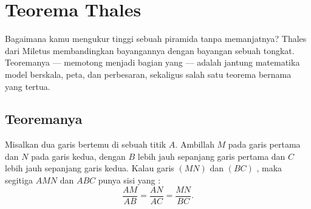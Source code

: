 \chapter{Teorema Thales}\label{ch:g9:thales}

Bagaimana kamu mengukur tinggi sebuah piramida tanpa memanjatnya?
Thales dari Miletus membandingkan bayangannya dengan bayangan sebuah
tongkat. Teoremanya ---  memotong  menjadi
bagian yang  --- adalah jantung matematika model berskala,
peta, dan perbesaran, sekaligus salah satu teorema bernama yang
tertua.

\section{Teoremanya}

\begin{theorem}[Thales]\label{thm:g9:thales:direct}
Misalkan dua garis bertemu di sebuah titik $A$. Ambillah $M$ pada
garis pertama dan $N$ pada garis kedua, dengan $B$ lebih jauh sepanjang
garis pertama dan $C$ lebih jauh sepanjang garis kedua. Kalau garis
$(MN)$ dan $(BC)$ \emph{}, maka segitiga $AMN$ dan $ABC$ punya
sisi yang :
\[
\frac{AM}{AB} = \frac{AN}{AC} = \frac{MN}{BC}.
\]
\end{theorem}
\admitted

